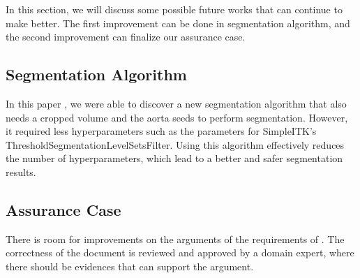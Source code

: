 In this section, we will discuss some possible future works that can continue to make \progname{} better. The first improvement can be done in segmentation algorithm, and the second improvement can finalize our assurance case.

\subsection{Segmentation Algorithm}

In this paper \cite{6346433}, we were able to discover a new segmentation algorithm that also needs a cropped volume and the aorta seeds to perform segmentation. However, it required less hyperparameters such as the parameters for SimpleITK's ThresholdSegmentationLevelSetsFilter. Using this algorithm effectively reduces the number of hyperparameters, which lead to a better and safer segmentation results.

\subsection{Assurance Case}

There is room for improvements on the arguments of the requirements of \progname{}. The correctness of the document is reviewed and approved by a domain expert, where there should be evidences that can support the argument.
